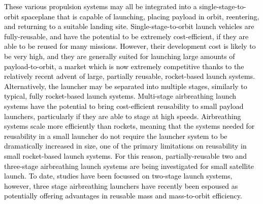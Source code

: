  	\textcolor{black}{These various propulsion systems may all be integrated into a single-stage-to-orbit spaceplane that is capable of launching, placing payload in orbit, reentering, and returning to a suitable landing site\cite{Argus,Powell1991,Trefny1999,Roche2000,Pescetelli2012,Young2006,Bradford2000,Hyperion}. Single-stage-to-orbit launch vehicles are fully-reusable, and have the potential to be extremely cost-efficient, if they are able to be reused for many missions\cite{Mcclinton2008}. However, their development cost is likely to be very high, and they are generally suited for launching large amounts of payload-to-orbit\cite{Argus,Powell1991,Trefny1999,Roche2000,Pescetelli2012,Young2006,Bradford2000,Hyperion}, a market which is now extremely competitive thanks to the relatively recent advent of large, partially reusable, rocket-based launch systems. Alternatively, the launcher may be separated into multiple stages, similarly to typical, fully rocket-based launch systems\cite{Wilhite1991,Fujikawa2017,Mehta2001,Takahashi1997,Aberleen,Germain2001,Eklund2012,Bradford2002,Kimura1999,Preller2018a}. Multi-stage airbreathing launch systems have the potential to bring cost-efficient reusability to small payload launchers\cite{Preller2017b}, particularly if they are able to stage at high speeds\cite{Mcclinton2008}. Airbreathing systems scale more efficiently than rockets, meaning that the systems needed for reusability in a small launcher do not require the launcher system to be dramatically increased in size, one of the primary limitations on reusability in small rocket-based launch systems. For this reason, partially-reusable two and three-stage airbreathing launch systems are being investigated for small satellite launch\cite{Preller2017b}. To date, studies have been focussed on two-stage launch systems, however, three stage airbreathing launchers have recently been espoused as potentially offering advantages in reusable mass and mass-to-orbit efficiency\cite{Preller2017b}.}
  	
